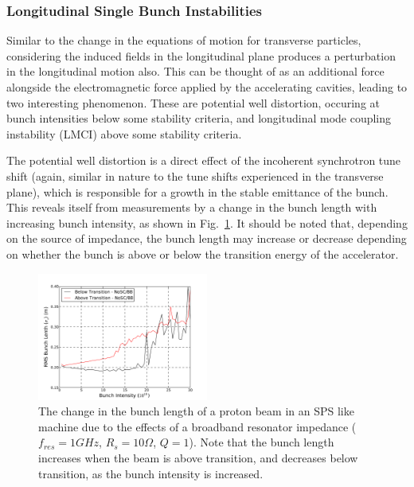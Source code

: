 \subsubsection{Longitudinal Single Bunch Instabilities}

Similar to the change in the equations of motion for transverse particles, considering the induced fields in the longitudinal plane produces a perturbation in the longitudinal motion also. This can be thought of as an additional force alongside the electromagnetic force applied by the accelerating cavities, leading to two interesting phenomenon. These are potential well distortion, occuring at bunch intensities below some stability criteria, and longitudinal mode coupling instability (LMCI) above some stability criteria.

The potential well distortion is a direct effect of the incoherent synchrotron tune shift (again, similar in nature to the tune shifts experienced in the transverse plane), which is responsible for a growth in the stable emittance of the bunch. This reveals itself from measurements by a change in the bunch length with increasing bunch intensity, as shown in Fig.~\ref{fig:pot_well_dist}. It should be noted that, depending on the source of impedance, the bunch length may increase or decrease depending on whether the bunch is above or below the transition energy of the accelerator.

\begin{figure}
\begin{center}
\includegraphics[width=0.5\textwidth]{Wakefields_and_Impedances/figures/rms_bunch_length_AT_BT_BB.pdf}
\end{center}
\caption{The change in the bunch length of a proton beam in an SPS like machine due to the effects of a broadband resonator impedance ($f_{res} = 1GHz$, $R_{s}=10 \Omega$, $Q=1$). Note that the bunch length increases when the beam is above transition, and decreases below transition, as the bunch intensity is increased.}
\label{fig:pot_well_dist}
\end{figure}


